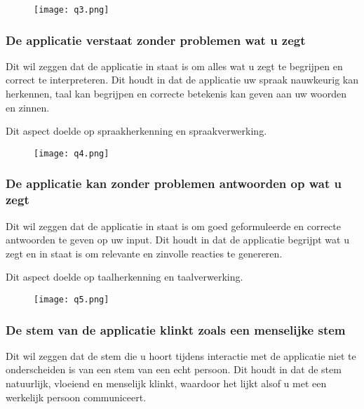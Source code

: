\begin{figure}[htbp]
    \centering
    \texttt{[image: q3.png]}
    \label{fig:vraag_3_resultaat}
\end{figure}

\subsubsection{De applicatie verstaat zonder problemen wat u zegt}

Dit wil zeggen dat de applicatie in staat is om alles wat u zegt te begrijpen en correct te interpreteren. Dit houdt in dat de applicatie uw spraak nauwkeurig kan herkennen, taal kan begrijpen en correcte betekenis kan geven aan uw woorden en zinnen.

Dit aspect doelde op spraakherkenning en spraakverwerking.

\begin{figure}[htbp]
    \centering
    \texttt{[image: q4.png]}
    \label{fig:vraag_4_resultaat}
\end{figure}

\subsubsection{De applicatie kan zonder problemen antwoorden op wat u zegt}

Dit wil zeggen  dat de applicatie in staat is om goed geformuleerde en correcte antwoorden te geven op uw input. Dit houdt in dat de applicatie begrijpt wat u zegt en in staat is om relevante en zinvolle reacties te genereren. 

Dit aspect doelde op taalherkenning en taalverwerking.

\begin{figure}[htbp]
    \centering
    \texttt{[image: q5.png]}
    \label{fig:vraag_5_resultaat}
\end{figure}

\subsubsection{De stem van de applicatie klinkt zoals een menselijke stem}

Dit wil zeggen dat de stem die u hoort tijdens interactie met de applicatie niet te onderscheiden is van een stem van een echt persoon. Dit houdt in dat de stem natuurlijk, vloeiend en menselijk klinkt, waardoor het lijkt alsof u met een werkelijk persoon communiceert.

